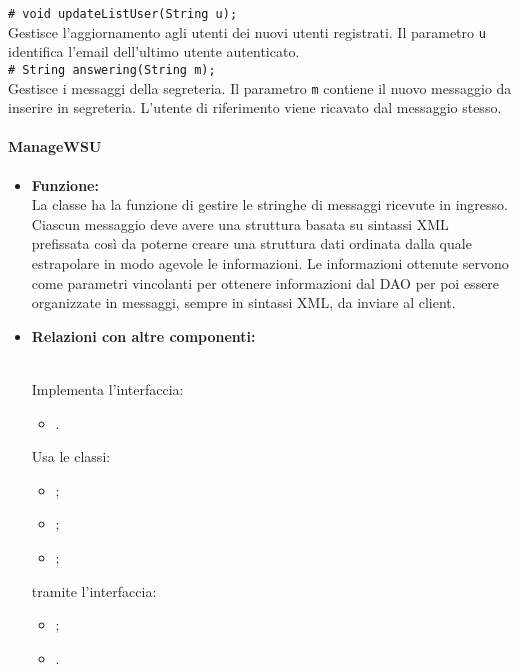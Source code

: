 {{\begin{sloppypar}
{{{\begin{itemize}
{					  \texttt{\# void updateListUser(String u);}\\
					  Gestisce l'aggiornamento agli utenti dei nuovi utenti registrati.
					  Il parametro \texttt{u} identifica l'email dell'ultimo utente autenticato.\\
					  
					  \texttt{\# String answering(String m);}\\
					  Gestisce i messaggi della segreteria.
					  Il parametro \texttt{m} contiene il nuovo messaggio da inserire in segreteria. L'utente di riferimento viene ricavato dal messaggio stesso.\\
				}
			\end{itemize}
		}



		\paragraph{ManageWSU}\label{par:ManageWSU}{
			\begin{itemize}
				\item[] \textbf{Funzione:}\\
					La classe ha la funzione di gestire le stringhe di messaggi ricevute in ingresso.
					Ciascun messaggio deve avere una struttura basata su sintassi XML\g~ prefissata così da poterne creare una struttura dati ordinata dalla quale estrapolare in modo agevole le informazioni.
					Le informazioni ottenute servono come parametri vincolanti per ottenere informazioni dal DAO per poi essere organizzate in messaggi, sempre in sintassi XML\g, da inviare al client\g.\\
			
			\item[] \textbf{Relazioni con altre componenti:}{\\
				Implementa l'interfaccia:
					\begin{itemize}
						\item[] .
					\end{itemize}
				Usa le classi:
					\begin{itemize}
				 		\item[] ;
				 		\item[] ;
				 		\item[] ;
				 	\end{itemize}
				tramite l'interfaccia:
				 	\begin{itemize}
				 		\item[]	;
				 		\item[] .\\
					\end{itemize}
				}
				

\end{itemize}}}}
\end{sloppypar}}}
